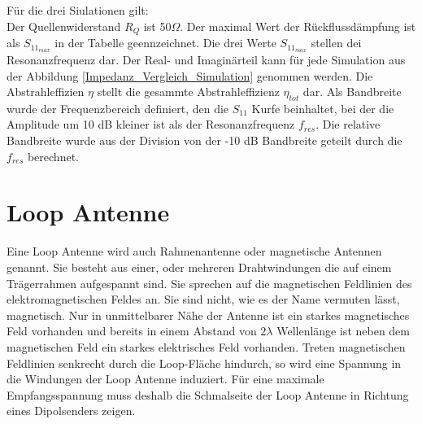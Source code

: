 Für die drei Siulationen gilt:\\
Der Quellenwiderstand $R_Q$ ist 50$\Omega$. Der maximal Wert der Rückflussdämpfung ist als $S_{11_{max}}$ in der Tabelle geennzeichnet. Die drei Werte $S_{11_{max}}$ stellen dei Resonanzfrequenz dar. Der Real- und Imaginärteil kann für jede Simulation aus der Abbildung \ref{Impedanz_Vergleich_Simulation} genommen werden. Die Abstrahleffizien $\eta$ stellt die gesammte Abstrahleffizienz $\eta_{tot}$ dar. Als Bandbreite wurde der Frequenzbereich definiert, den die $S_11$ Kurfe beinhaltet, bei der die Amplitude um 10 dB kleiner ist als der Resonanzfrequenz $f_{res}$. Die relative Bandbreite wurde aus der Division von der -10 dB Bandbreite geteilt durch die $f_{res}$ berechnet.


\newpage
\section{Loop Antenne}
Eine Loop Antenne wird auch Rahmenantenne oder magnetische Antennen genannt. Sie besteht aus einer, oder mehreren Drahtwindungen die auf einem Trägerrahmen aufgespannt sind. Sie sprechen auf die magnetischen Feldlinien des elektromagnetischen Feldes an. Sie sind nicht, wie es der Name vermuten lässt, magnetisch. Nur in unmittelbarer Nähe der Antenne ist ein starkes magnetisches Feld vorhanden und bereits in einem Abstand von $2\lambda$ Wellenlänge ist neben dem magnetischen Feld ein starkes elektrisches Feld vorhanden. Treten magnetischen Feldlinien senkrecht durch die Loop-Fläche hindurch, so wird eine Spannung in die Windungen der Loop Antenne induziert. Für eine maximale Empfangsspannung muss deshalb die Schmalseite der Loop Antenne in Richtung eines Dipolsenders zeigen.


